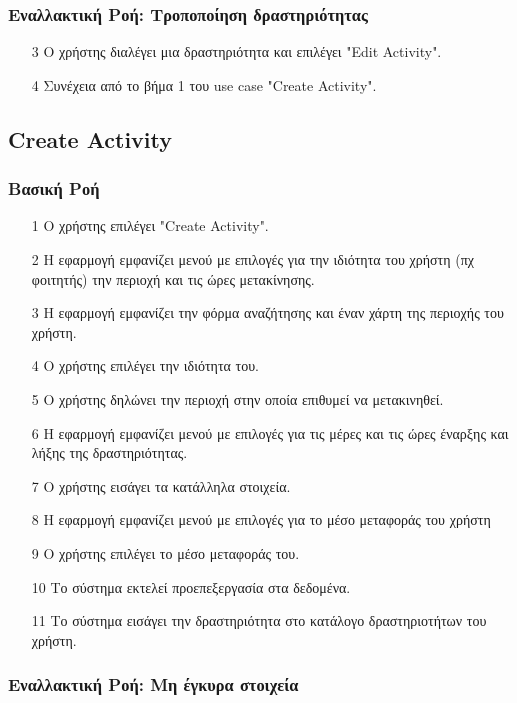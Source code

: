 \subsubsection{Εναλλακτική Ροή: Τροποποίηση δραστηριότητας}

\begin{enumerate}
    \item[3] Ο χρήστης διαλέγει μια δραστηριότητα και επιλέγει "Edit Activity".
    \item[4] Συνέχεια από το βήμα 1 του use case "Create Activity".
\end{enumerate}

\subsection{Create Activity}

\subsubsection{Βασική Ροή}

\begin{enumerate}
    \item[1] Ο χρήστης επιλέγει "Create Activity".
    \item[2] Η εφαρμογή εμφανίζει μενού με επιλογές για την ιδιότητα του χρήστη (πχ φοιτητής) την
        περιοχή και τις ώρες μετακίνησης.
    \item[3] Η εφαρμογή εμφανίζει την φόρμα αναζήτησης και έναν χάρτη της περιοχής του χρήστη.
    \item[4] Ο χρήστης επιλέγει την ιδιότητα του.
    \item[5] Ο χρήστης δηλώνει την περιοχή στην οποία επιθυμεί να μετακινηθεί.
    \item[6] Η εφαρμογή εμφανίζει μενού με επιλογές για τις μέρες και τις ώρες έναρξης και λήξης
        της δραστηριότητας.
    \item[7] Ο χρήστης εισάγει τα κατάλληλα στοιχεία.
    \item[8] H εφαρμογή εμφανίζει μενού με επιλογές για το μέσο μεταφοράς του χρήστη
    \item[9] Ο χρήστης επιλέγει το μέσο μεταφοράς του.
    \item[10] Το σύστημα εκτελεί προεπεξεργασία στα δεδομένα.
    \item[11] Το σύστημα εισάγει την δραστηριότητα στο κατάλογο δραστηριοτήτων του χρήστη.
\end{enumerate}

\subsubsection{Εναλλακτική Ροή: Μη έγκυρα στοιχεία}

